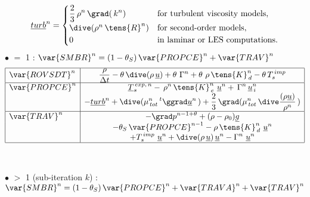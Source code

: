 \begin{equation}\notag
\underline{turb}^{n}=
\begin{cases}
\displaystyle\frac {2}{3}\,\rho^{n}\,\grad (\,k^{n}) &
\text{for turbulent viscosity models}, \\
\dive(\rho^{n}\,\tens{R}^n) & \text{for second-order models},\\
0 & \text{in laminar or LES computations.}\\
\end{cases}
\end{equation}
$\bullet$  $=$ 1 : $\var{SMBR}^n=(1-\theta_S)\,\var{PROPCE}^n+\var{TRAV}^n$
\begin{equation}\label{Base_Predvv_tab_ext0}
\begin{array}{|l|c|}
\hline
\var{ROVSDT}^{n}
& \displaystyle
\frac{\rho}{\Delta t} -\theta \,\dive (\rho\,\underline {u}) +\theta \,\, \Gamma^n + \theta \,\, \rho\,\tens{K}_{\,d}^n-\theta \,T_s^{\,imp} \\
\hline
\var{PROPCE}^{n}
& \displaystyle
\underline{T}_{s}^{\,exp,\,n}-\,\rho^{n}\,\tens{K}_{\,e}^{n}\ \underline{u}^{n} + \,\Gamma^{n}\,\underline{u}_{\,i}^{n}\\
& \displaystyle
-\underline{turb}^{n}+ \dive (\mu_{\,tot}^{n}\,^t\ggrad \underline {u}^{n}\,)+ \frac {2} {3}\,\grad (\mu_{\,tot}^{n}\,\dive \frac{(\rho \underline {u})}{\rho^{n}}\,)\\
\hline
\var{TRAV}^{n} & \displaystyle
- \grad p^{n-1+\theta} + (\rho -\rho_0) \underline {g} \\
& \displaystyle
-\theta_S\,\var{PROPCE}^{n-1} -\rho\,\tens{K}_{\,d}^n\ \underline{u}^{n} \\
& \displaystyle
+ T_s^{\,imp}\,\,\underline {u}^{n} + \dive (\rho\,\underline {u})\,\underline{u}^{n} - \Gamma^n\,\,\underline{u}^{n}\\
\hline
\end{array}
\end{equation}
\\\\
$\bullet$  $>$ 1 (sub-iteration $k$) : $\var{SMBR}^n=(1-\theta_S)\,\var{PROPCE}^n+\var{TRAVA}^n+\var{TRAV}^n$
